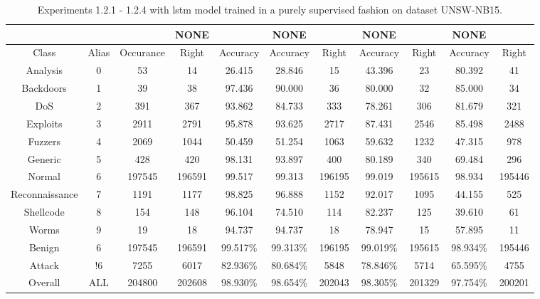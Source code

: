 \begin{table}[htb]
    \centering
    \begin{tabular}{@{}ccccccccccc@{}}
        \toprule
         &  &  & NONE &  & NONE &  & NONE &  & NONE &  \\
        \midrule
        Class &  Alias &  Occurance &  Right &  Accuracy &  Accuracy &  Right &  Accuracy &  Right &  Accuracy &  Right \\
        Analysis &  0 &  53 &  14 &  26.415 &  28.846 &  15 &  43.396 &  23 &  80.392 &  41 \\
        Backdoors &  1 &  39 &  38 &  97.436 &  90.000 &  36 &  80.000 &  32 &  85.000 &  34 \\
        DoS &  2 &  391 &  367 &  93.862 &  84.733 &  333 &  78.261 &  306 &  81.679 &  321 \\
        Exploits &  3 &  2911 &  2791 &  95.878 &  93.625 &  2717 &  87.431 &  2546 &  85.498 &  2488 \\
        Fuzzers &  4 &  2069 &  1044 &  50.459 &  51.254 &  1063 &  59.632 &  1232 &  47.315 &  978 \\
        Generic &  5 &  428 &  420 &  98.131 &  93.897 &  400 &  80.189 &  340 &  69.484 &  296 \\
        Normal &  6 &  197545 &  196591 &  99.517 &  99.313 &  196195 &  99.019 &  195615 &  98.934 &  195446 \\
        Reconnaissance &  7 &  1191 &  1177 &  98.825 &  96.888 &  1152 &  92.017 &  1095 &  44.155 &  525 \\
        Shellcode &  8 &  154 &  148 &  96.104 &  74.510 &  114 &  82.237 &  125 &  39.610 &  61 \\
        Worms &  9 &  19 &  18 &  94.737 &  94.737 &  18 &  78.947 &  15 &  57.895 &  11 \\
        Benign &  6 &  197545 &  196591 &  99.517\% &  99.313\% &  196195 &  99.019\% &  195615 &  98.934\% &  195446 \\
        Attack &  !6 &  7255 &  6017 &  82.936\% &  80.684\% &  5848 &  78.846\% &  5714 &  65.595\% &  4755 \\
        Overall &  ALL &  204800 &  202608 &  98.930\% &  98.654\% &  202043 &  98.305\% &  201329 &  97.754\% &  200201 \\
        \bottomrule
    \end{tabular}
    \caption{Experiments 1.2.1 - 1.2.4 with \gls{lstm} model trained in a purely supervised fashion on dataset UNSW-NB15.}
    \label{table:results:lstm:flows15_supervised}
\end{table}